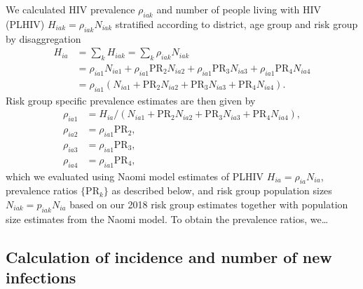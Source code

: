 \documentclass[
]{article}
\begin{document}
We calculated HIV prevalence \(\rho_{iak}\) and number of people living
with HIV (PLHIV) \(H_{iak} = \rho_{iak} N_{iak}\) stratified according
to district, age group and risk group by disaggregation \begin{align}
    H_{ia} &= \sum_k H_{iak} = \sum_k \rho_{iak} N_{iak} \\
    &= \rho_{ia1} N_{ia1} + \rho_{ia1} \text{PR}_2 N_{ia2} + \rho_{ia1} \text{PR}_3 N_{ia3} + \rho_{ia1} \text{PR}_4 N_{ia4} \\
    &= \rho_{ia1} \left(N_{ia1} + \text{PR}_2 N_{ia2} + \text{PR}_3 N_{ia3} + \text{PR}_4 N_{ia4} \right).
\end{align} Risk group specific prevalence estimates are then given by
\begin{align}
    \rho_{ia1} &= H_{ia} / \left(N_{ia1} + \text{PR}_2 N_{ia2} + \text{PR}_3 N_{ia3} + \text{PR}_4 N_{ia4} \right), \\
    \rho_{ia2} &= \rho_{ia1} \text{PR}_2,\\
    \rho_{ia3} &= \rho_{ia1} \text{PR}_3,\\
    \rho_{ia4} &= \rho_{ia1} \text{PR}_4,
\end{align} which we evaluated using Naomi model estimates of PLHIV
\(H_{ia} = \rho_{ia} N_{ia}\), prevalence ratios \(\{\text{PR}_k\}\) as
described below, and risk group population sizes
\(N_{iak} = p_{iak} N_{ia}\) based on our 2018 risk group estimates
together with population size estimates from the Naomi model. To obtain
the prevalence ratios, we\ldots{}

\hypertarget{calculation-of-incidence-and-number-of-new-infections}{%
\subsection{Calculation of incidence and number of new
infections}\label{calculation-of-incidence-and-number-of-new-infections}}
\end{document}
